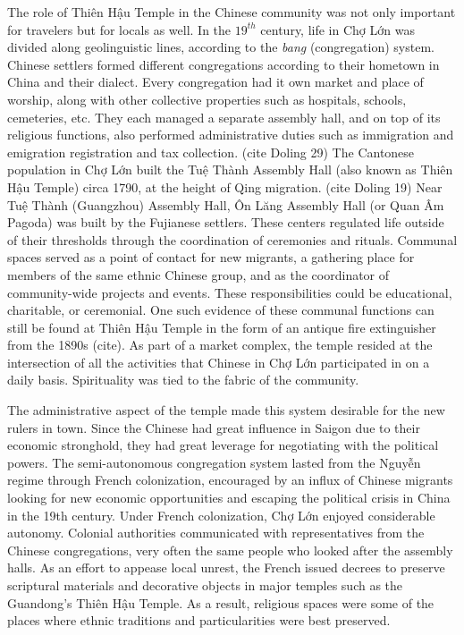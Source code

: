 \vi The role of Thiên Hậu Temple in the Chinese community was not only important for travelers but for locals as well. In the $19^{th}$ century, life in Chợ Lớn was divided along geolinguistic lines, according to the \textit{bang} (congregation) system. Chinese settlers formed different congregations according to their hometown in China and their dialect. Every congregation had it own market and place of worship, along with other collective properties such as hospitals, schools, cemeteries, etc. They each managed a separate assembly hall, and on top of its religious functions, also performed administrative duties such as immigration and emigration registration and tax collection. (cite Doling 29) The Cantonese population in Chợ Lớn built the Tuệ Thành Assembly Hall (also known as Thiên Hậu Temple) circa 1790, at the height of Qing migration. (cite Doling 19) Near Tuệ Thành (Guangzhou) Assembly Hall, Ôn Lăng Assembly Hall (or Quan Âm Pagoda) was built by the Fujianese settlers. These centers regulated life outside of their thresholds through the coordination of ceremonies and rituals. Communal spaces served as a point of contact for new migrants, a gathering place for members of the same ethnic Chinese group, and as the coordinator of community-wide projects and events. These responsibilities could be educational, charitable, or ceremonial. One such evidence of these communal functions can still be found at Thiên Hậu Temple in the form of an antique fire extinguisher from the 1890s (cite). As part of a market complex, the temple resided at the intersection of all the activities that Chinese in Chợ Lớn participated in on a daily basis. Spirituality was tied to the fabric of the community.

The administrative aspect of the temple made this system desirable for the new rulers in town. Since the Chinese had great influence in Saigon due to their economic stronghold, they had great leverage for negotiating with the political powers. The semi-autonomous congregation system lasted from the Nguyễn regime through  French colonization, encouraged by an influx of Chinese migrants looking for new economic opportunities and escaping the political crisis in China in the 19th century. Under French colonization, Chợ Lớn enjoyed considerable autonomy. Colonial authorities communicated with representatives from the Chinese congregations, very often the same people who looked after the assembly halls. As an effort to appease local unrest, the French issued decrees to preserve scriptural materials and decorative objects in major temples such as the Guandong’s Thiên Hậu Temple. As a result, religious spaces were some of the places where ethnic traditions and particularities were best preserved. \en

